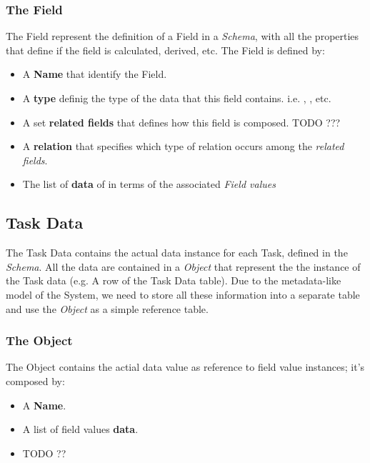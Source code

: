 \subsubsection{The Field}
The Field represent the definition of a Field in a \emph{Schema}, with all the
properties that define if the field is calculated, derived, etc. The Field is
defined by:
\begin{itemize}
    \item A \textbf{Name} that identify the Field.
    
    \item A \textbf{type} definig the type of the data that this field contains.
    i.e. , , etc.

    \item A set \textbf{related fields} that defines how this field is composed.
    TODO ???
    
    \item A \textbf{relation} that specifies which type of relation occurs among
    the \emph{related fields}.

    \item The list of \textbf{data} of in terms of the associated \emph{Field
    values}
\end{itemize}





\subsection{Task Data}
The Task Data contains the actual data instance for each Task, defined in the
\emph{Schema}. All the data are contained in a \emph{Object} that represent the
the instance of the Task data (e.g. A row of the Task Data table). Due to the
metadata-like model of the System, we need to store all these information into
a separate table and use the \emph{Object} as a simple reference table.

\subsubsection{The Object}
The Object contains the actial data value as reference to field value instances;
it's composed by:
\begin{itemize}
    \item A \textbf{Name}.
    \item A list of field values \textbf{data}.
    \item TODO ??
\end{itemize}


